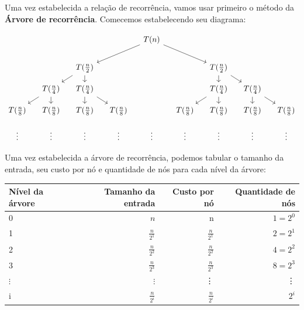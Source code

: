 Uma vez estabelecida a relação de recorrência, vamos usar primeiro o método da \textbf{Árvore de recorrência}. Comecemos estabelecendo seu diagrama:

\[\begin{tikzcd}[sep=small]
		&&&& {T(n)} \\
		\\
		&& {T(\frac{n}{2})} &&&& {T(\frac{n}{2})} \\
		& {T(\frac{n}{4})} & {T(\frac{n}{4})} &&&& {T(\frac{n}{4})} & {T(\frac{n}{4})} \\
		{T(\frac{n}{8})} & {T(\frac{n}{8})} & {T(\frac{n}{8})} & {T(\frac{n}{8})} && {T(\frac{n}{8})} & {T(\frac{n}{8})} & {T(\frac{n}{8})} & {T(\frac{n}{8})} \\
		\vdots & \vdots & \vdots & \vdots & \vdots & \vdots & \vdots & \vdots & \vdots
		\arrow[from=1-5, to=3-3]
		\arrow[from=1-5, to=3-7]
		\arrow[from=3-3, to=4-2]
		\arrow[from=3-3, to=4-3]
		\arrow[from=3-7, to=4-7]
		\arrow[from=3-7, to=4-8]
		\arrow[from=4-2, to=5-1]
		\arrow[from=4-2, to=5-2]
		\arrow[from=4-3, to=5-3]
		\arrow[from=4-3, to=5-4]
		\arrow[from=4-7, to=5-6]
		\arrow[from=4-7, to=5-7]
		\arrow[from=4-8, to=5-8]
		\arrow[from=4-8, to=5-9]
	\end{tikzcd}\]
\FloatBarrier

Uma vez estabelecida a árvore de recorrência, podemos tabular o tamanho da entrada, seu custo por nó e quantidade de nós para cada nível da árvore:


\begin{table}[h!]
	\centering
	\begin{tabular}{lrrr}
		\toprule
		Nível da árvore & Tamanho da entrada & Custo por nó    & Quantidade de nós \\
		\midrule
		0               & $n$                & n               & $1 = 2^0$         \\
		1               & $\frac{n}{2^1}$    & $\frac{n}{2^1}$ & $2 = 2^1$         \\
		2               & $\frac{n}{2^2}$    & $\frac{n}{2^2}$ & $4 = 2^2$         \\
		3               & $\frac{n}{2^3}$    & $\frac{n}{2^3}$ & $8 = 2^3$         \\
		$\vdots$        & $\vdots$           & \vdots          & \vdots            \\
		i               & $\frac{n}{2^i}$    & $\frac{n}{2^i}$ & $2^i$             \\
		\bottomrule
	\end{tabular}
\end{table}
\FloatBarrier


